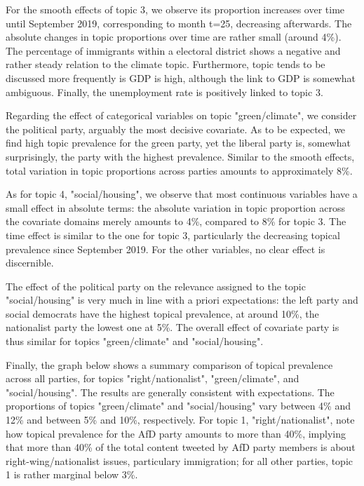 For the smooth effects of topic 3, we observe its proportion increases over time until September 2019, corresponding to month t=25, decreasing afterwards. The absolute changes in topic proportions over time are rather small (around 4\%). The percentage of immigrants within a electoral district shows a negative and rather steady relation to the climate topic. Furthermore, topic tends to be discussed more frequently is GDP is high, although the link to GDP is somewhat ambiguous. Finally, the unemployment rate is positively linked to topic 3.

Regarding the effect of categorical variables on topic "green/climate", we consider the political party, arguably the most decisive covariate. As to be expected, we find high topic prevalence for the green party, yet the liberal party is, somewhat surprisingly, the party with the highest prevalence. Similar to the smooth effects, total variation in topic proportions across parties amounts to approximately 8\%.

As for topic 4, "social/housing", we observe that most continuous variables have a small effect in absolute terms: the absolute variation in topic proportion across the covariate domains merely amounts to 4\%, compared to 8\% for topic 3. The time effect is similar to the one for topic 3, particularly the decreasing topical prevalence since September 2019. For the other variables, no clear effect is discernible.

The effect of the political party on the relevance assigned to the topic "social/housing" is very much in line with a priori expectations: the left party and social democrats have the highest topical prevalence, at around 10\%, the nationalist party the lowest one at 5\%. The overall effect of covariate party is thus similar for topics "green/climate" and "social/housing".

Finally, the graph below shows a summary comparison of topical prevalence across all parties, for topics "right/nationalist", "green/climate", and "social/housing". The results are generally consistent with expectations. The proportions of topics "green/climate" and "social/housing" vary between 4\% and 12\% and between 5\% and 10\%, respectively. For topic 1,  "right/nationalist", note how topical prevalence for the AfD party amounts to more than 40\%, implying that more than 40\% of the total content tweeted by AfD party members is about right-wing/nationalist issues, particulary immigration; for all other parties, topic 1 is rather marginal below 3\%.


